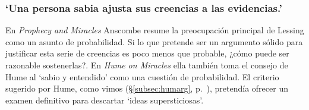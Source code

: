 \subsubsection{\enquote*{Una persona sabia ajusta sus creencias a las evidencias.}}

En \emph{Prophecy and Miracles} Anscombe resume la preocupación principal de Lessing como un asunto de probabilidad. Si lo que pretende ser un argumento sólido para justificar esta serie de creencias es poco menos que probable, ¿cómo puede ser razonable sostenerlas?. En \emph{Hume on Miracles} ella también toma el consejo de Hume al `sabio y entendido' como una cuestión de probabilidad. El criterio sugerido por Hume, como vimos (\S\ref{subsec:humarg}, p.~\pageref{subsec:humarg}),
pretendía ofrecer un examen definitivo para descartar `ideas supersticiosas'.
